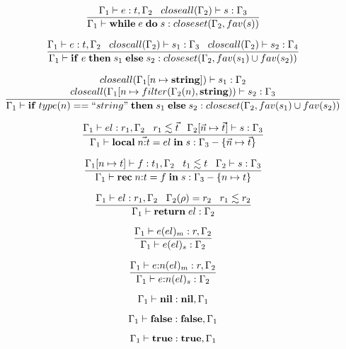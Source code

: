 \[
\dfrac{\Gamma_{1} \vdash e:t, \Gamma_{2} \;\;\;
       closeall(\Gamma_{2}) \vdash s:\Gamma_{3}}
      {\Gamma_{1} \vdash \mathbf{while} \; e \; \mathbf{do} \; s:closeset(\Gamma_{2}, fav(s))}
\]

\[
\dfrac{\Gamma_{1} \vdash e:t, \Gamma_{2} \;\;\;
       closeall(\Gamma_{2}) \vdash s_{1}:\Gamma_{3} \;\;\;
       closeall(\Gamma_{2}) \vdash s_{2}:\Gamma_{4}}
      {\Gamma_{1} \vdash \mathbf{if} \; e \; \mathbf{then} \; s_{1} \; \mathbf{else} \; s_{2}:closeset(\Gamma_{2}, fav(s_{1}) \cup fav(s_{2}))}
\]

\[
\dfrac{\begin{array}{c}
       closeall(\Gamma_{1}[n \mapsto \mathbf{string}]) \vdash s_{1}:\Gamma_{2} \\
       closeall(\Gamma_{1}[n \mapsto filter(\Gamma_{2}(n), \mathbf{string})) \vdash s_{2}:\Gamma_{3}
      \end{array}}
      {\Gamma_{1} \vdash \mathbf{if} \; type(n) == ``string" \; \mathbf{then} \; s_{1} \; \mathbf{else} \; s_{2}:closeset(\Gamma_{2}, fav(s_{1}) \cup fav(s_{2}))}
\]

\[
\dfrac{\Gamma_{1} \vdash el:r_{1}, \Gamma_{2} \;\;\;
       r_{1} \lesssim \vec{t} \;\;\;
       \Gamma_{2}[\vec{n} \mapsto \vec{t}] \vdash s:\Gamma_{3}}
      {\Gamma_{1} \vdash \mathbf{local} \; \vec{n{:}t} = el \; \mathbf{in} \; s:\Gamma_{3} - \{\vec{n} \mapsto \vec{t}\}}
\]

\[
\dfrac{\Gamma_{1}[n \mapsto t] \vdash f:t_{1}, \Gamma_{2} \;\;\;
       t_{1} \lesssim t \;\;\;
       \Gamma_{2} \vdash s:\Gamma_{3}}
      {\Gamma_{1} \vdash \mathbf{rec} \; n{:}t = f \; \mathbf{in} \; s:\Gamma_{3} - \{n \mapsto t\}}
\]

\[
\dfrac{\Gamma_{1} \vdash el:r_{1}, \Gamma_{2} \;\;\;
       \Gamma_{2}(\rho) = r_{2} \;\;\;
       r_{1} \lesssim r_{2}}
      {\Gamma_{1} \vdash \mathbf{return} \; el:\Gamma_{2}}
\]

\[
\dfrac{\Gamma_{1} \vdash e(el)_{m}:r, \Gamma_{2}}
      {\Gamma_{1} \vdash e(el)_{s}:\Gamma_{2}}
\]

\[
\dfrac{\Gamma_{1} \vdash e{:}n(el)_{m}:r, \Gamma_{2}}
      {\Gamma_{1} \vdash e{:}n(el)_{s}:\Gamma_{2}}
\]

\[
\Gamma_{1} \vdash \mathbf{nil}:\mathbf{nil}, \Gamma_{1}
\]

\[
\Gamma_{1} \vdash \mathbf{false}:\mathbf{false}, \Gamma_{1}
\]

\[
\Gamma_{1} \vdash \mathbf{true}:\mathbf{true}, \Gamma_{1}
\]

